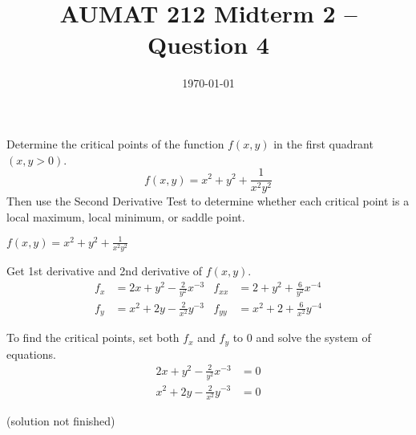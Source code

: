 \documentclass[12pt,a4paper]{article}
\title{AUMAT 212 Midterm 2 -- Question 4}
\date{\today}
\begin{document}
    \begin{problem}
        Determine the critical points of the function \(f(x,y)\) in the first quadrant \((x,y > 0)\).
        \[
          f(x,y) = x^2 + y^2 + \frac{1}{x^2 y^2}
        \]
        Then use the Second Derivative Test to determine whether each critical point is a local maximum, local minimum, or saddle point.
    \end{problem}
    \begin{answer}
        \(\displaystyle f(x,y) = x^2 + y^2 + \frac{1}{x^2 y^2}\)
        
        Get 1st derivative and 2nd derivative of \(f(x,y)\).
        \begin{align*}
            f_{x} &= 2x + y^2 - \frac{2}{y^2} x^{-3} & f_{xx} &= 2 + y^2 + \frac{6}{y^2} x^{-4} \\
            f_{y} &= x^2 + 2y - \frac{2}{x^2} y^{-3} & f_{yy} &= x^2 + 2 + \frac{6}{x^2} y^{-4}
        \end{align*}

        To find the critical points, set both \(f_x\) and \(f_y\) to 0 and solve the system of equations.
        \begin{align*}
            2x + y^2 - \frac{2}{y^2} x^{-3} &= 0 \\
            x^2 + 2y - \frac{2}{x^2} y^{-3} &= 0
        \end{align*}

        (solution not finished)
    \end{answer}
\end{document}
